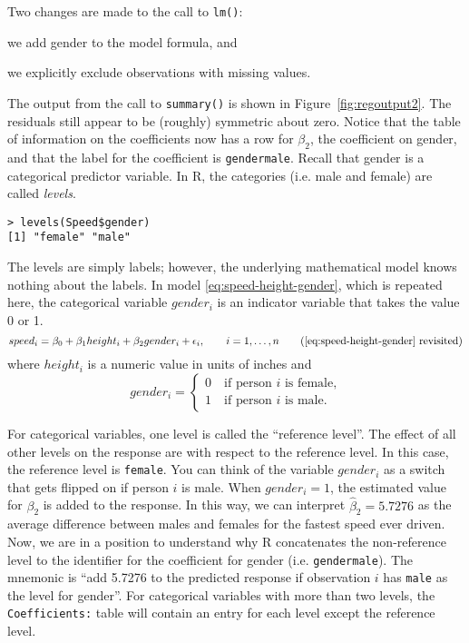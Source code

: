 Two changes are made to the call to \texttt{lm()}:
\begin{inparaenum}[1)]
\item we add gender to the model formula, and
\item we explicitly exclude observations with missing values.
\end{inparaenum}
The output from the call to \texttt{summary()} is shown in
Figure~\ref{fig:regoutput2}. The residuals still appear to be
(roughly) symmetric about zero. Notice that the table of information
on the coefficients now has a row for $\beta_2$, the coefficient on
gender, and that the label for the coefficient is \texttt{gendermale}.
Recall that gender is a categorical predictor variable. In R, the categories
(i.e. male and female) are called \emph{levels}.

\begin{Verbatim}[samepage=true]
> levels(Speed$gender)
[1] "female" "male"  
\end{Verbatim}

The levels are simply labels; however, the underlying mathematical
model knows nothing about the labels.  In model
\ref{eq:speed-height-gender}, which is repeated here, the categorical
variable
$gender_i$ is an indicator variable that takes the value 0 or 1.
\begin{equation*}
  speed_i = \beta_0 + \beta_1 height_i + \beta_2 gender_i + \epsilon_i, \qquad i=1,\ldots,n
\tag{\ref{eq:speed-height-gender} revisited}
\end{equation*}
where $height_i$ is a numeric value in units of inches and
\begin{equation*}
  gender_i = \begin{cases}
0 \quad \text{if person $i$ is female,}\\
1 \quad \text{if person $i$ is male.}
\end{cases}
\end{equation*}

For categorical variables, one level is called the ``reference
level''. The effect of all other levels on the response are with
respect to the reference level. In this case, the reference level is
\texttt{female}. You can think of the variable $gender_i$ as a switch
that gets flipped on if person $i$ is male. When $gender_i = 1$, the
estimated value for $\beta_2$ is added to the response. In this way,
we can interpret $\hat{\beta}_2 = 5.7276$ as the average difference
between males and females for the fastest speed ever driven. Now, we
are in a position to understand why R concatenates the non-reference
level to the identifier for the coefficient for gender
(i.e. \texttt{gendermale}).  The mnemonic is ``add 5.7276 to the
predicted response if observation $i$ has \texttt{male} as the level
for gender''.  For categorical variables with more than two levels,
the \texttt{Coefficients:} table will contain an entry for each level
except the reference level.

